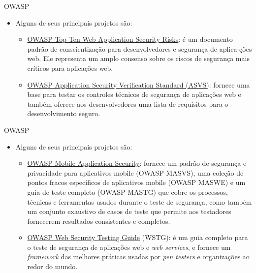 \documentclass{beamer}
\begin{document}
\begin{frame}{OWASP}
	\begin{itemize}
		\justifying
		\item Alguns de seus principais projetos são:
			\begin{itemize}
				\justifying
				\item<1> \href{https://owasp.org/www-project-top-ten/}{OWASP Top Ten Web Application Security Risks}: é um documento padrão de conscientização para desenvolvedores e segurança de aplica-ções web. Ele representa um amplo consenso sobre os riscos de segurança mais críticos para aplicações web.
				\item<2> \href{https://owasp.org/www-project-application-security-verification-standard/}{OWASP Application Security Verification Standard (ASVS)}: fornece uma base para testar os controles técnicos de segurança de aplicações web e também oferece aos desenvolvedores uma lista de requisitos para o desenvolvimento seguro.
			\end{itemize}
	\end{itemize}
\end{frame}

\begin{frame}{OWASP}
	\begin{itemize}
		\justifying
		\item Alguns de seus principais projetos são:
			\begin{itemize}
				\justifying
				\item<1> \href{https://owasp.org/www-project-mobile-app-security/}{OWASP Mobile Application Security}: fornece um padrão de segurança e privacidade para aplicativos mobile (OWASP MASVS), uma coleção de pontos fracos específicos de aplicativos mobile (OWASP MASWE) e um guia de teste completo (OWASP MASTG) que cobre os processos, técnicas e ferramentas usados durante o teste de segurança, como também um conjunto exaustivo de casos de teste que permite aos testadores fornecerem resultados consistentes e completos.
				\item<2> \href{https://owasp.org/www-project-web-security-testing-guide/}{OWASP Web Security Testing Guide} (WSTG): é um guia completo para o teste de segurança de aplicações web e \textit{web services}, e fornece um \textit{framework} das melhores práticas usadas por \textit{pen testers} e organizações ao redor do mundo.
			\end{itemize}
	\end{itemize}
\end{frame}
\end{document}
